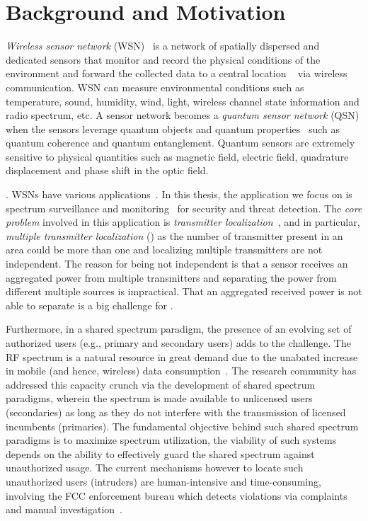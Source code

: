 \section{Background and Motivation}

\emph{Wireless sensor network} (WSN)~\cite{wsn_survey} is a network of spatially dispersed and dedicated sensors that monitor and record the 
physical conditions of the environment and forward the collected data to a central location ~\cite{wsn_wiki} via wireless communication.
WSN can measure environmental conditions such as temperature, sound, humidity, wind, light, wireless channel state information and radio spectrum, etc.
A sensor network becomes a \emph{quantum sensor network} (QSN) when the sensors leverage quantum objects and quantum properties~\cite{RevModPhys.quantumsensing}
such as quantum coherence and quantum entanglement.
Quantum sensors are extremely sensitive to physical quantities such as magnetic field, electric field, quadrature displacement
and phase shift in the optic field.

. WSNs have various applications~\cite{tsn17-water,sensys10-health,mobicom03-sensor}.
In this thesis, the application we focus on is spectrum surveillance and monitoring~\cite{arani2018} for security and threat detection.
The \emph{core problem} involved in this application is \emph{transmitter localization}~\cite{ton-sensorselect,caitao2023qsn},
 and in particular, \emph{multiple transmitter localization} (\mtl) as 
the number of transmitter present in an area could be more than one and localizing multiple transmitters are not independent.
The reason for being not independent is that a sensor receives an aggregated power from multiple transmitters and separating 
the power from different multiple sources is impractical.
That an aggregated received power is not able to separate is a big challenge for \mtl.

Furthermore, in a shared spectrum paradigm, the presence of an evolving set of authorized users 
(e.g., primary and secondary users) adds to the challenge.
The RF spectrum is a natural resource in great demand due to the unabated increase in mobile (and hence, wireless) data consumption~\cite{Jeffrey14}. 
The research community has addressed this capacity crunch via the development of shared spectrum paradigms, wherein the spectrum 
is made available to unlicensed users (secondaries) as long as they do not interfere with the transmission of licensed incumbents (primaries).
The fundamental objective behind such shared spectrum paradigms is to maximize spectrum utilization,
the viability of such systems depends on the ability to effectively guard the shared spectrum against unauthorized usage. 
The current mechanisms however to locate such unauthorized users (intruders) are human-intensive and time-consuming, 
involving the FCC enforcement bureau which detects violations via complaints and manual investigation~\cite{mobicom17-splot}. 


